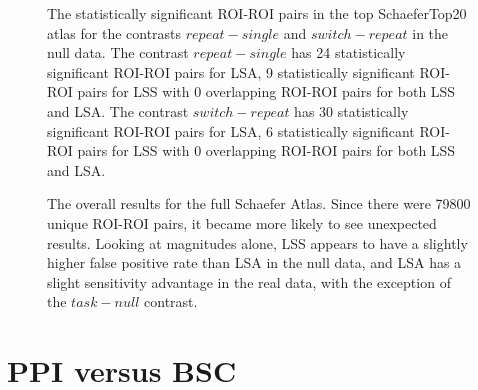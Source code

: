\documentclass[phd,figures,tables,ackpage,abstractpage,publicabstractpage]{uithesis}
\begin{document}
\begin{figure}[H]
  \ContinuedFloat
  \centering


  \caption[All contrasts for all atlases for all data continued...]{
      The statistically significant ROI-ROI pairs in the top SchaeferTop20 atlas
      for the contrasts $repeat - single$ and $switch - repeat$ in the null data.
      The contrast $repeat - single$ has 24 statistically significant ROI-ROI
      pairs for LSA, 9 statistically significant ROI-ROI pairs
      for LSS with 0 overlapping ROI-ROI pairs for both LSS and LSA.
      The contrast $switch - repeat$ has 30 statistically significant ROI-ROI
      pairs for LSA, 6 statistically significant ROI-ROI pairs
      for LSS with 0 overlapping ROI-ROI pairs for both LSS and LSA.
  }
  \label{fig:significant-contrasts5}
\end{figure}

\begin{figure}[H]
  \centering


  \caption[LSS/LSA comparison using real data in the full Schaefer Atlas]{
      The overall results for the full Schaefer Atlas.
      Since there were 79800 unique ROI-ROI pairs, it became more likely
      to see unexpected results.
      Looking at magnitudes alone, LSS appears to have a slightly
      higher false positive rate than LSA in the null data, and 
      LSA has a slight sensitivity advantage in the real data, 
      with the exception of the $task - null$ contrast.
  }
  \label{fig:significant-contrasts6}
\end{figure}

\chapter{PPI versus BSC}
\end{document}
